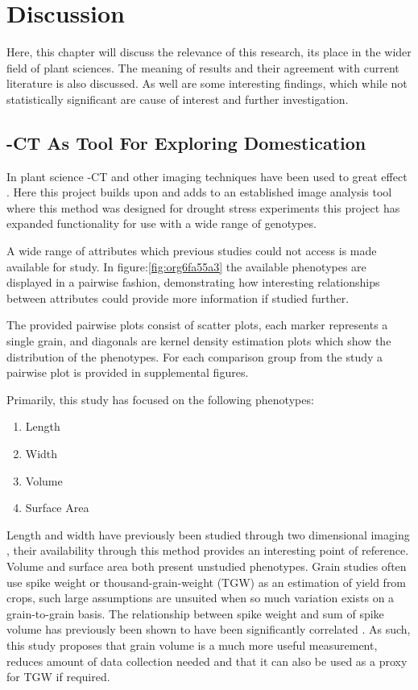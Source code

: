 \documentclass[11pt]{report}
\begin{document}
\clearpage
\chapter{Discussion}
\label{sec:org9f28e30}

Here, this chapter will discuss the relevance of this research, its place in the wider field of plant sciences. The meaning of results and their agreement with current literature is also discussed. As well are some interesting findings, which while not statistically significant are cause of interest and further investigation.

\section{\textmu{}-CT As Tool For Exploring Domestication}
\label{sec:org8e73826}
In plant science \textmu{}-CT and other imaging techniques have been used to great effect \cite{Hubeau2015,Staedler2013,Metzner2015}. Here this project builds upon and adds to an established image analysis tool \cite{Hughes2017} where this method was designed for drought stress experiments this project has expanded functionality for use with a wide range of genotypes.

A wide range of attributes which previous studies could not access \cite{Gegas2010} is made available for study. In figure:\ref{fig:org6fa55a3} the available phenotypes are displayed in a pairwise fashion, demonstrating how interesting relationships between attributes could provide more information if studied further.

The provided pairwise plots consist of scatter plots, each marker represents a single grain, and diagonals are kernel density estimation plots which show the distribution of the phenotypes. For each comparison group from the study a pairwise plot is provided in supplemental figures.

Primarily, this study has focused on the following phenotypes:

\begin{enumerate}
\item Length
\item Width
\item Volume
\item Surface Area
\end{enumerate}

Length and width have previously been studied through two dimensional imaging \cite{Gegas2010}, their availability through this method provides an interesting point of reference. Volume and surface area both present unstudied phenotypes. Grain studies often use spike weight or thousand-grain-weight (TGW) as an estimation of yield from crops, such large assumptions are unsuited when so much variation exists on a grain-to-grain basis. The relationship between spike weight and sum of spike volume has previously been shown to have been significantly correlated \cite{Hughes2017}. As such, this study proposes that grain volume is a much more useful measurement, reduces amount of data collection needed and that it can also be used as a proxy for TGW if required.
\end{document}
